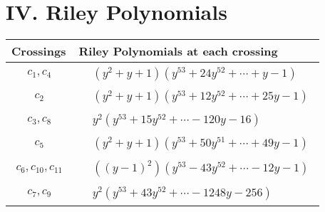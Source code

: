 \documentclass[1p]{elsarticle_modified}
\theoremstyle{definition}
\begin{document}
\centering \section*{ IV. Riley Polynomials}
\begin{tabular}{m{50pt}|m{274pt}}
Crossings & \hspace{64pt}Riley Polynomials at each crossing \\
\hline $$\begin{aligned}c_{1},c_{4}\end{aligned}$$&$\begin{aligned}
&(y^2+y+1)(y^{53}+24 y^{52}+\cdots+y-1)
\end{aligned}$\\
\hline $$\begin{aligned}c_{2}\end{aligned}$$&$\begin{aligned}
&(y^2+y+1)(y^{53}+12 y^{52}+\cdots+25 y-1)
\end{aligned}$\\
\hline $$\begin{aligned}c_{3},c_{8}\end{aligned}$$&$\begin{aligned}
&y^2(y^{53}+15 y^{52}+\cdots-120 y-16)
\end{aligned}$\\
\hline $$\begin{aligned}c_{5}\end{aligned}$$&$\begin{aligned}
&(y^2+y+1)(y^{53}+50 y^{51}+\cdots+49 y-1)
\end{aligned}$\\
\hline $$\begin{aligned}c_{6},c_{10},c_{11}\end{aligned}$$&$\begin{aligned}
&((y-1)^2)(y^{53}-43 y^{52}+\cdots-12 y-1)
\end{aligned}$\\
\hline $$\begin{aligned}c_{7},c_{9}\end{aligned}$$&$\begin{aligned}
&y^2(y^{53}+43 y^{52}+\cdots-1248 y-256)
\end{aligned}$\\
\hline
\end{tabular}
\vskip 2pc
\end{document}
